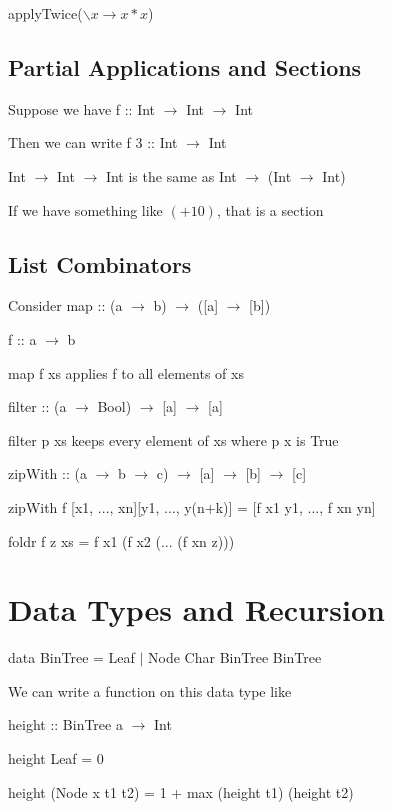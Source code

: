 \documentclass[12pt]{article}
\begin{document}
applyTwice($\backslash x \to x * x$)

\subsection{Partial Applications and Sections}

Suppose we have f :: Int $\to$ Int $\to$ Int

Then we can write f 3 :: Int $\to$ Int

Int $\to$ Int $\to$ Int is the same as Int $\to$ (Int $\to$ Int)

If we have something like $(+ 10)$, that is a section

\subsection{List Combinators}

Consider map :: (a $\to$ b) $\to$ ([a] $\to$ [b])

f :: a $\to$ b

map f xs applies f to all elements of xs

filter :: (a $\to$ Bool) $\to$ [a] $\to$ [a]

filter p xs keeps every element of xs where p x is True

zipWith :: (a $\to$ b $\to$ c) $\to$ [a] $\to$ [b] $\to$ [c]

zipWith f [x1, ..., xn][y1, ..., y(n+k)] = [f x1 y1, ..., f xn yn]

foldr f z xs = f x1 (f x2 (... (f xn z)))

\section{Data Types and Recursion}

data BinTree = Leaf $|$ Node Char BinTree BinTree

We can write a function on this data type like

height :: BinTree a $\to$ Int

height Leaf = 0

height (Node x t1 t2) = 1 + max (height t1) (height t2)
\end{document}
